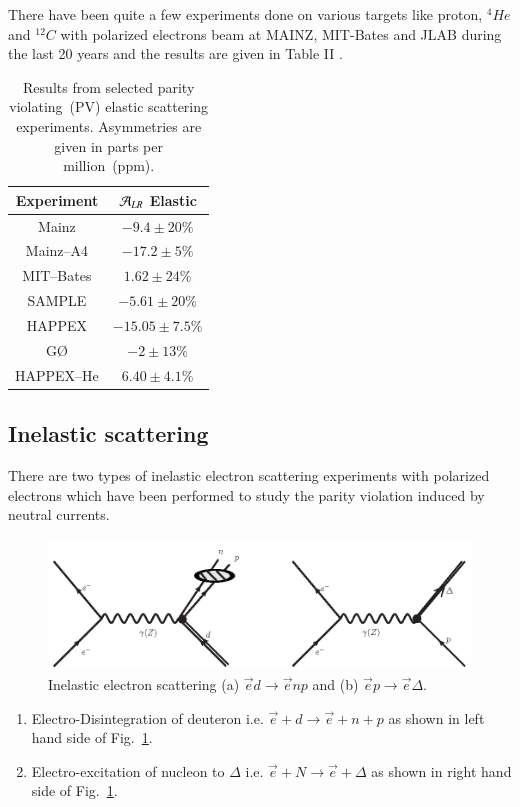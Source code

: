 There have been quite a few experiments done on various targets like proton, $^4{He}$ and $^{12}{C}$ with polarized electrons beam at MAINZ, MIT-Bates and JLAB during the last 20 years and the results are given in Table II \cite{chap9-key22}.
\begin{table}[H]
\centering
\renewcommand{\arraystretch}{1.15}
\begin{tabular}{|c|c|}
\hline
Experiment  & ${\cal A}_{LR}$ Elastic\\ 
\hline
Mainz& $-9.4\pm20\%$ \\ 
\hline
Mainz--A4&$-17.2\pm 5\%$ \\
\hline
MIT--Bates& $1.62\pm 24\%$\\
\hline
SAMPLE& $-5.61\pm 20\%$ \\
\hline
HAPPEX& $-15.05\pm 7.5\%$\\ 
\hline
G\O &$-2\pm13\%$ \\ 
\hline 
HAPPEX--He& $6.40\pm4.1\%$\\ 
\hline
\end{tabular}
\caption{Results from selected parity violating~(PV) elastic scattering experiments. Asymmetries are given in parts per million~(ppm).}
\label{chap9-tab2}
\end{table}


\subsection{Inelastic scattering}\label{chap9-subsec3.2}

There are two types of inelastic electron scattering experiments with polarized electrons which have been performed to study the parity violation induced by neutral currents.
\begin{figure}[t]
\centering
\includegraphics[scale=0.4]{src/images/chap9/fig2.jpg}
\caption{Inelastic electron scattering (a) $\vec{e}d\rightarrow\vec{e}np$ and (b) $\vec{e}p\rightarrow \vec{e}\Delta$.}\label{chap9-fig3}
\end{figure}
\begin{enumerate}
    \item Electro-Disintegration of deuteron i.e. $\vec{e}+d \rightarrow \vec{e}+n+p$ as shown in left hand side of Fig.~\ref{chap9-fig3}. 
    \item Electro-excitation of nucleon to $\Delta$ i.e. $\vec{e}+N \rightarrow \vec{e}+\Delta$ as shown in right hand side of Fig.~\ref{chap9-fig3}.  
\end{enumerate}   

